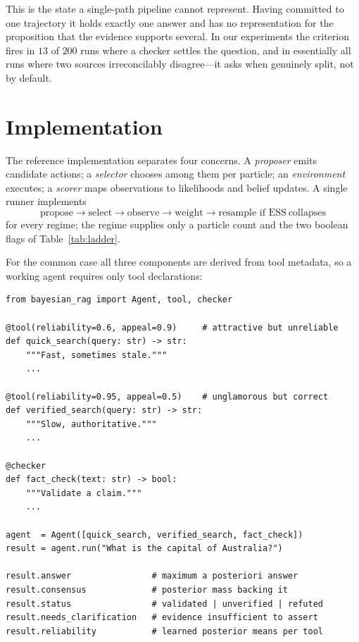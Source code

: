 \documentclass[11pt,a4paper]{article}
\begin{document}
This is the state a single-path pipeline cannot represent. Having committed to
one trajectory it holds exactly one answer and has no representation for the
proposition that the evidence supports several. In our experiments the
criterion fires in $13$ of $200$ runs where a checker settles the question, and
in essentially all runs where two sources irreconcilably disagree---it asks
when genuinely split, not by default.

\section{Implementation}

The reference implementation separates four concerns. A \emph{proposer} emits
candidate actions; a \emph{selector} chooses among them per particle; an
\emph{environment} executes; a \emph{scorer} maps observations to likelihoods
and belief updates. A single runner implements
\[
\text{propose} \rightarrow \text{select} \rightarrow \text{observe}
\rightarrow \text{weight} \rightarrow \text{resample if } \mathrm{ESS}\ \text{collapses}
\]
for every regime; the regime supplies only a particle count and the two boolean
flags of Table~\ref{tab:ladder}.

For the common case all three components are derived from tool metadata, so a
working agent requires only tool declarations:

\begin{lstlisting}[caption={The complete high-level API.}]
from bayesian_rag import Agent, tool, checker

@tool(reliability=0.6, appeal=0.9)     # attractive but unreliable
def quick_search(query: str) -> str:
    """Fast, sometimes stale."""
    ...

@tool(reliability=0.95, appeal=0.5)    # unglamorous but correct
def verified_search(query: str) -> str:
    """Slow, authoritative."""
    ...

@checker
def fact_check(text: str) -> bool:
    """Validate a claim."""
    ...

agent  = Agent([quick_search, verified_search, fact_check])
result = agent.run("What is the capital of Australia?")

result.answer                # maximum a posteriori answer
result.consensus             # posterior mass backing it
result.status                # validated | unverified | refuted
result.needs_clarification   # evidence insufficient to assert
result.reliability           # learned posterior means per tool
\end{lstlisting}
\end{document}
